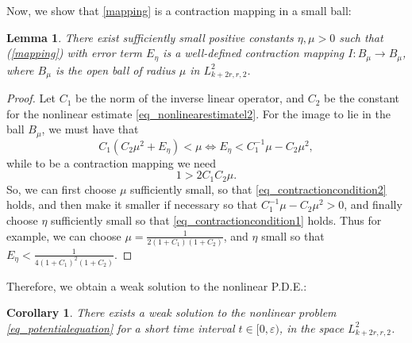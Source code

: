 \documentclass[10pt, a4paper]{article}
\theoremstyle{plain}%
\newtheorem{lem}[theorem]{Lemma}
\newtheorem{coro}[theorem]{Corollary}
\theoremstyle{definition}
\numberwithin{figure}{section}
\numberwithin{equation}{section}
\newcommand{\rt}{\rightarrow}
\newcommand{\ep}{\varepsilon}
\begin{document}
 Now, we show that \eqref{mapping} is a contraction mapping in a small ball:
\begin{lem}
	There exist sufficiently small positive constants $\eta,\mu>0$ such that (\ref{mapping}) with error term $E_\eta$ is a well-defined contraction mapping $I: B_\mu \rt B_\mu$, where $B_\mu$ is the open ball of radius $\mu$ in $L^2_{k+2r,r,2}$. 
\end{lem}
\begin{proof}
	Let $C_1$ be the norm of the inverse linear operator, and $C_2$ be the constant for the nonlinear estimate \eqref{eq_nonlinearestimatel2}. For the image to lie in the ball $B_\mu$, we must have that \begin{equation}\label{eq_contractioncondition1}
	C_1(C_2\mu^2+E_\eta)<\mu \iff  E_\eta < C_1^{-1}\mu-C_2\mu^2,
	\end{equation}
	while to be a contraction mapping we need \begin{equation}\label{eq_contractioncondition2}
	1>2C_1C_2\mu.
	\end{equation}
	So, we can first choose $\mu$ sufficiently  small, so that \eqref{eq_contractioncondition2} holds, and then make it smaller if necessary so that $C_1^{-1}\mu-C_2\mu^2 >0$, and finally choose $\eta$ sufficiently small so that \eqref{eq_contractioncondition1} holds. Thus for example, we can choose $\mu=\frac{1}{2(1+C_1)(1+C_2)}$, and $\eta$ small so that $E_\eta < \frac{1}{4(1+C_1)^2(1+C_2)}$.	
\end{proof}

Therefore, we obtain a weak solution to the nonlinear P.D.E.:
\begin{coro}
	There exists a weak solution to the nonlinear problem \eqref{eq_potentialequation} for a short time interval $t\in[0,\ep)$, in the space $L^2_{k+2r,r,2}$. 
\end{coro}
\end{document}
